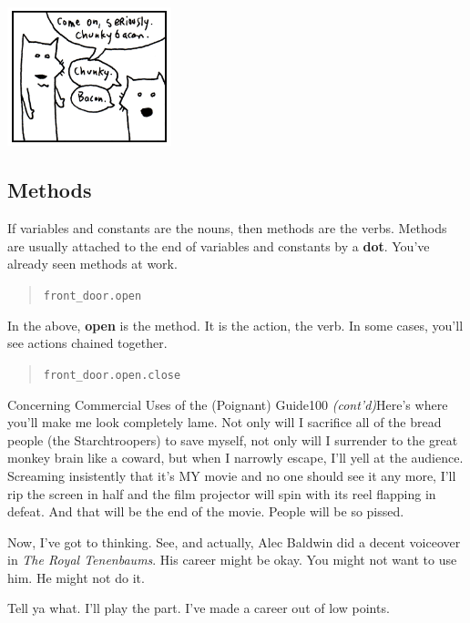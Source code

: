\documentclass[10pt,twoside]{report}
\begin{document}
	\includegraphics[width=0.3575\textwidth]{cache/11.png}




\subsection{Methods}



If variables and constants are the nouns, then methods are the
verbs. Methods are usually attached to the end of variables and
constants by a {\bf dot}.  You've already seen methods at work.

\begin{quote}
\lstinline[breaklines=true]|front_door.open|\end{quote}


In the above, {\bf open} is the method.  It is the action, the
verb. In some cases, you'll see actions chained together.

\begin{quote}
\lstinline[breaklines=true]|front_door.open.close|\end{quote}

	\begin{sidebar}{Concerning Commercial Uses of the (Poignant) Guide}{100}
		\textit{(cont'd)}Here's where you'll make me look completely lame. Not only will I sacrifice all of the bread people (the Starchtroopers) to save myself, not only will I surrender to the great monkey brain like a coward, but when I narrowly escape, I'll yell at the audience. Screaming insistently that it's MY movie and no one should see it any more, I'll rip the screen in half and the film projector will spin with its reel flapping in defeat. And that will be the end of the movie. People will be so pissed.\vspace{6pt}

		Now, I've got to thinking. See, and actually, Alec Baldwin did a decent voiceover in \textit{The Royal Tenenbaums}. His career might be okay. You might not want to use him. He might not do it.\vspace{6pt}

		Tell ya what. I'll play the part. I've made a career out of low points.
	\end{sidebar}
\end{document}
